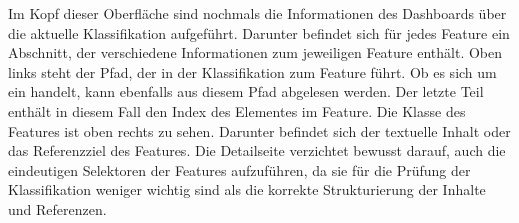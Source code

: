     Im Kopf dieser Oberfläche sind nochmals die Informationen
    des Dashboards über die aktuelle Klassifikation aufgeführt.
    Darunter befindet sich für jedes Feature ein Abschnitt,
    der verschiedene Informationen zum jeweiligen Feature enthält.
    Oben links steht der Pfad,
    der in der Klassifikation zum Feature führt.
    Ob es sich um ein {\collectionFeature} handelt,
    kann ebenfalls aus diesem Pfad abgelesen werden.
    Der letzte Teil enthält in diesem Fall den Index des Elementes im Feature.
    Die Klasse des Features ist oben rechts zu sehen.
    Darunter befindet sich der textuelle Inhalt oder das Referenzziel
    des Features.
    Die Detailseite verzichtet bewusst darauf, auch die eindeutigen Selektoren der Features aufzuführen,
    da sie für die Prüfung der Klassifikation weniger wichtig sind
    als die korrekte Strukturierung der Inhalte und Referenzen.
